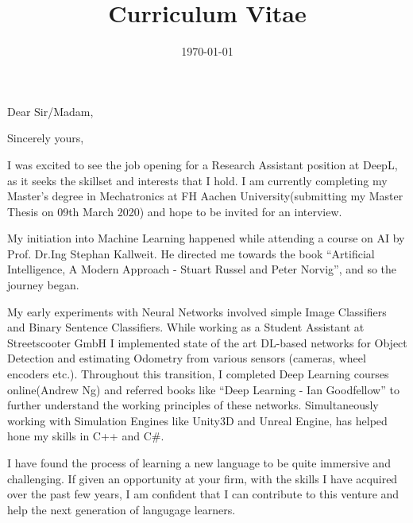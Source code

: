 \documentclass[11pt,a4paper,roman]{moderncv} %
\title{\Large{Curriculum Vitae}}
\begin{document}


\clearpage

\date{\today} %
\opening{Dear Sir/Madam,} %
\closing{Sincerely yours,} %

\makelettertitle %

\justify

I was excited to see the job opening for a Research Assistant position at DeepL, 
as it seeks the skillset and interests that I hold. I am currently completing my
Master's degree in Mechatronics at FH Aachen University(submitting my Master Thesis on 09th March 2020) and 
hope to be  invited for an interview.

My initiation into Machine Learning happened while attending a course on AI 
by Prof. Dr.Ing Stephan Kallweit. He directed me towards the book \enquote{Artificial 
Intelligence, A Modern Approach - Stuart Russel and Peter Norvig}, and so the 
journey began.

My early experiments with Neural Networks involved simple Image 
Classifiers and Binary Sentence Classifiers. While working as a Student 
Assistant at Streetscooter GmbH I implemented state of the art 
DL-based networks for Object Detection and estimating Odometry 
from various sensors (cameras, wheel encoders etc.). 
Throughout this transition, I completed Deep Learning courses online(Andrew Ng) 
and referred books like \enquote{Deep Learning - Ian Goodfellow} to further understand 
the working principles of these networks. Simultaneously working with 
Simulation Engines like Unity3D and Unreal Engine, has helped hone my skills in C++ and C\#.

I have found the process of learning a new language to be quite immersive and 
challenging. If given an opportunity at your firm, with the skills I have acquired over the 
past few years, I am confident that I can contribute to this venture and help 
the next generation of langugage learners.
\end{document}
